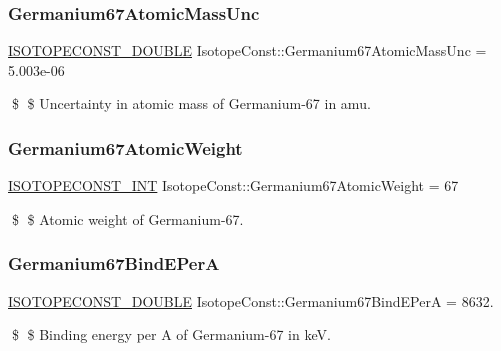 \subsubsection{\texorpdfstring{Germanium67\+Atomic\+Mass\+Unc}{Germanium67AtomicMassUnc}}
{\footnotesize\ttfamily \mbox{\hyperlink{group___isotope_const-_macros_ga8f45a7272ce02c0b4c65c44636ed719a}{I\+S\+O\+T\+O\+P\+E\+C\+O\+N\+S\+T\+\_\+\+D\+O\+U\+B\+LE}} Isotope\+Const\+::\+Germanium67\+Atomic\+Mass\+Unc = 5.\+003e-\/06}

\$ \$ Uncertainty in atomic mass of Germanium-\/67 in amu. \mbox{\label{group___isotope_const-_germanium-_ge67_gac320c31f67811f69966de525454735f0}} 
\subsubsection{\texorpdfstring{Germanium67\+Atomic\+Weight}{Germanium67AtomicWeight}}
{\footnotesize\ttfamily \mbox{\hyperlink{group___isotope_const-_macros_ga5f18360b3e99483a35c32d789e62621c}{I\+S\+O\+T\+O\+P\+E\+C\+O\+N\+S\+T\+\_\+\+I\+NT}} Isotope\+Const\+::\+Germanium67\+Atomic\+Weight = 67}

\$ \$ Atomic weight of Germanium-\/67. \mbox{\label{group___isotope_const-_germanium-_ge67_gab392630c32a854369224b6b7aa5e840e}} 
\subsubsection{\texorpdfstring{Germanium67\+Bind\+E\+PerA}{Germanium67BindEPerA}}
{\footnotesize\ttfamily \mbox{\hyperlink{group___isotope_const-_macros_ga8f45a7272ce02c0b4c65c44636ed719a}{I\+S\+O\+T\+O\+P\+E\+C\+O\+N\+S\+T\+\_\+\+D\+O\+U\+B\+LE}} Isotope\+Const\+::\+Germanium67\+Bind\+E\+PerA = 8632.}

\$ \$ Binding energy per A of Germanium-\/67 in keV. \mbox{\label{group___isotope_const-_germanium-_ge67_gac8d76ed344abd7b63d25cb263dd213cf}} 

